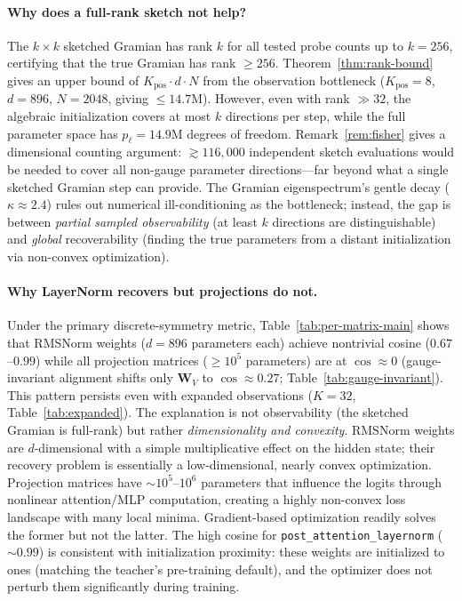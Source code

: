 \documentclass{article}
\newcommand{\bW}{\mathbf{W}}
\begin{document}
\paragraph{Why does a full-rank sketch not help?}
The $k \times k$ sketched Gramian has rank $k$ for all tested probe counts up to $k = 256$, certifying that the true Gramian has rank $\geq 256$.  Theorem~\ref{thm:rank-bound} gives an upper bound of $K_\text{pos} \cdot d \cdot N$ from the observation bottleneck ($K_\text{pos}{=}8$, $d{=}896$, $N{=}2048$, giving $\leq 14.7\text{M}$).  However, even with rank $\gg 32$, the algebraic initialization covers at most $k$ directions per step, while the full parameter space has $p_\ell = 14.9\text{M}$ degrees of freedom.  Remark~\ref{rem:fisher} gives a dimensional counting argument: $\gtrsim 116{,}000$ independent sketch evaluations would be needed to cover all non-gauge parameter directions---far beyond what a single sketched Gramian step can provide.  The Gramian eigenspectrum's gentle decay ($\kappa \approx 2.4$) rules out numerical ill-conditioning as the bottleneck; instead, the gap is between \emph{partial sampled observability} (at least $k$ directions are distinguishable) and \emph{global} recoverability (finding the true parameters from a distant initialization via non-convex optimization).

\paragraph{Why LayerNorm recovers but projections do not.}
Under the primary discrete-symmetry metric, Table~\ref{tab:per-matrix-main} shows that RMSNorm weights ($d = 896$ parameters each) achieve nontrivial cosine ($0.67$--$0.99$) while all projection matrices ($\geq 10^5$ parameters) are at $\cos \approx 0$ (gauge-invariant alignment shifts only $\bW_V$ to $\cos \approx 0.27$; Table~\ref{tab:gauge-invariant}).  This pattern persists even with expanded observations ($K{=}32$, Table~\ref{tab:expanded}).  The explanation is not observability (the sketched Gramian is full-rank) but rather \emph{dimensionality and convexity}.  RMSNorm weights are $d$-dimensional with a simple multiplicative effect on the hidden state; their recovery problem is essentially a low-dimensional, nearly convex optimization.  Projection matrices have $\sim 10^5$--$10^6$ parameters that influence the logits through nonlinear attention/MLP computation, creating a highly non-convex loss landscape with many local minima.  Gradient-based optimization readily solves the former but not the latter.  The high cosine for \texttt{post\_attention\_layernorm} ($\sim 0.99$) is consistent with initialization proximity: these weights are initialized to ones (matching the teacher's pre-training default), and the optimizer does not perturb them significantly during training.
\end{document}
